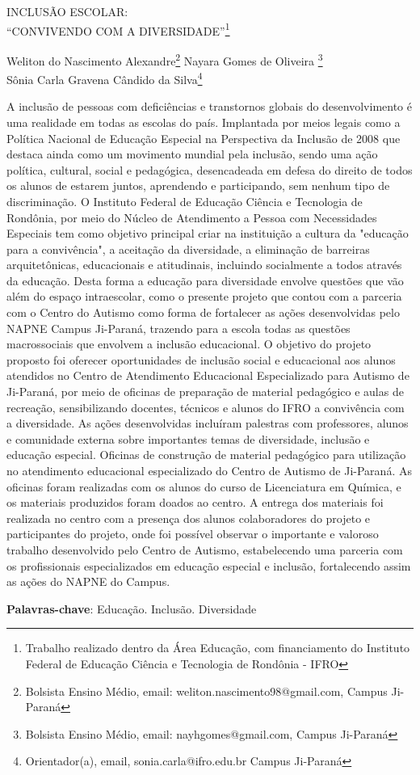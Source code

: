 \documentclass[article,12pt,onesidea,4paper,english,brazil]{abntex2}
\begin{document}
	
	
	\frenchspacing 
	
	\begin{center}
		\LARGE INCLUSÃO ESCOLAR: \\“CONVIVENDO COM A DIVERSIDADE”\footnote{Trabalho realizado dentro da Área Educação, com financiamento do Instituto Federal de Educação Ciência e Tecnologia de Rondônia - IFRO}
		
		\normalsize
		Weliton do Nascimento Alexandre\footnote{Bolsista Ensino Médio, email: weliton.nascimento98@gmail.com, Campus Ji-Paraná} 
		Nayara Gomes de Oliveira \footnote{Bolsista Ensino Médio, email: nayhgomes@gmail.com, Campus Ji-Paraná } \\
		Sônia Carla Gravena Cândido da Silva\footnote{Orientador(a), email, sonia.carla@ifro.edu.br Campus Ji-Paraná}
	\end{center}
	
	\noindent 
	A inclusão de pessoas com deficiências e transtornos globais do desenvolvimento é uma realidade em todas as escolas do país.  Implantada por meios legais como a Política Nacional de Educação Especial na Perspectiva da Inclusão de 2008 que destaca ainda como um movimento mundial pela inclusão, sendo uma ação política, cultural, social e pedagógica, desencadeada em defesa do direito de todos os alunos de estarem juntos, aprendendo e participando, sem nenhum tipo de discriminação. O Instituto Federal de Educação Ciência e Tecnologia de Rondônia, por meio do Núcleo de Atendimento a Pessoa com Necessidades Especiais tem como objetivo principal criar na instituição a cultura da "educação para a convivência", a aceitação da diversidade, a eliminação de barreiras arquitetônicas, educacionais e atitudinais, incluindo socialmente a todos através da educação. Desta forma a educação para diversidade envolve questões que vão além do espaço intraescolar, como o presente projeto que contou com a parceria com o Centro do Autismo como forma de fortalecer as ações desenvolvidas pelo NAPNE Campus Ji-Paraná, trazendo para a escola todas as questões macrossociais que envolvem a inclusão educacional. O objetivo do projeto proposto foi oferecer oportunidades de inclusão social e educacional aos alunos atendidos no Centro de Atendimento Educacional Especializado para Autismo de Ji-Paraná, por meio de oficinas de preparação de material pedagógico e aulas de recreação, sensibilizando docentes, técnicos e alunos do IFRO a convivência com a diversidade. As ações desenvolvidas incluíram palestras com professores, alunos e comunidade externa sobre importantes temas de diversidade, inclusão e educação especial. Oficinas de construção de material pedagógico para utilização no atendimento educacional especializado do Centro de Autismo de Ji-Paraná. As oficinas foram realizadas com os alunos do curso de Licenciatura em Química, e os materiais produzidos foram doados ao centro. A entrega dos materiais foi realizada no centro com a presença dos alunos colaboradores do projeto e participantes do projeto, onde foi possível observar o importante e valoroso trabalho desenvolvido pelo Centro de Autismo, estabelecendo uma parceria com os profissionais especializados em educação especial e inclusão, fortalecendo assim as ações do NAPNE do Campus.
	
	
	\vspace{\onelineskip}
	
	\noindent
	\textbf{Palavras-chave}: Educação. Inclusão. Diversidade
	
\end{document}
